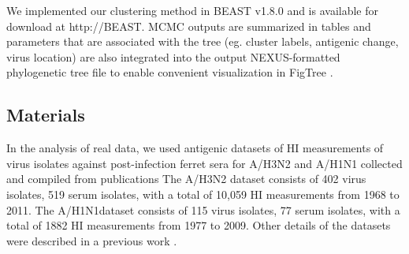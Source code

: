 \documentclass[11pt,oneside,letterpaper]{article}
\begin{document}
We implemented our clustering method in BEAST v1.8.0 and is available for download at http://BEAST.
MCMC outputs are summarized in tables and parameters that are associated with the tree (eg. cluster labels, antigenic change, virus location) are also integrated into the output NEXUS-formatted phylogenetic tree file to enable convenient visualization in FigTree \cite{FIGTREE}.














\subsection*{Materials}


In the analysis of real data, we used antigenic datasets \cite{bedford_integrating_2014} of HI measurements of virus isolates against post-infection ferret sera for A/H3N2 and A/H1N1 collected and compiled from publications \cite{Smith04,Kendal78,Webster79,Nakajima79,Nakajima81,Chakraverty82,Pereira82,Chakraverty86,Cox83,Daniels85,Raymond86,Stevens87,Donatelli93,Hay01,Daum02,McDonald07,Barr10}
The A/H3N2 dataset consists of 402 virus isolates, 519 serum isolates, with a total of 10,059 HI measurements from 1968 to 2011. 
The A/H1N1dataset consists of 115 virus isolates, 77 serum isolates, with a total of 1882 HI measurements from 1977 to 2009.
Other details of the datasets were described in a previous work \cite{bedford_integrating_2014}.
\end{document}
